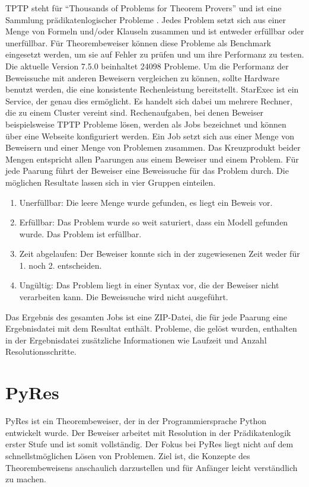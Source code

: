 TPTP steht für "`Thousands of Problems for Theorem Provers"' und ist eine Sammlung prädikatenlogischer Probleme \cite{Sutcliff2021TPTP}. Jedes Problem setzt sich aus einer Menge von Formeln und/oder Klauseln zusammen und ist entweder erfüllbar oder unerfüllbar. Für Theorembeweiser können diese Probleme als Benchmark eingesetzt werden, um sie auf Fehler zu prüfen und um ihre Performanz zu testen. Die aktuelle Version 7.5.0 beinhaltet 24098 Probleme.
Um die Performanz der Beweissuche mit anderen Beweisern vergleichen zu können, sollte Hardware benutzt werden, die eine konsistente Rechenleistung bereitstellt. StarExec ist ein Service, der genau dies ermöglicht. Es handelt sich dabei um mehrere Rechner, die zu einem Cluster vereint sind. \cite{Sutcliff2022StarExec}
 Rechenaufgaben, bei denen Beweiser beispielsweise TPTP Probleme lösen, werden als Jobs bezeichnet und können über eine Webseite konfiguriert werden. Ein Job setzt sich aus einer Menge von Beweisern und einer Menge von Problemen zusammen. Das Kreuzprodukt beider Mengen entspricht allen Paarungen aus einem Beweiser und einem Problem. Für jede Paarung führt der Beweiser eine Beweissuche für das Problem durch. Die möglichen Resultate lassen sich in vier Gruppen einteilen. 
\begin{enumerate}
	\item Unerfüllbar: Die leere Menge wurde gefunden, es liegt ein Beweis vor.
	\item Erfüllbar: Das Problem wurde so weit saturiert, dass ein Modell gefunden wurde. Das Problem ist erfüllbar.
	\item Zeit abgelaufen: Der Beweiser konnte sich in der zugewiesenen Zeit weder für 1. noch 2. entscheiden.
	\item Ungültig: Das Problem liegt in einer Syntax vor, die der Beweiser nicht verarbeiten kann. Die Beweissuche wird nicht ausgeführt.
\end{enumerate}
Das Ergebnis des gesamten Jobs ist eine ZIP-Datei, die für jede Paarung eine Ergebnisdatei mit dem Resultat enthält. Probleme, die gelöst wurden, enthalten in der Ergebnisdatei zusätzliche Informationen wie Laufzeit und Anzahl Resolutionsschritte.


	\section{PyRes}
PyRes ist ein Theorembeweiser, der in der Programmiersprache Python entwickelt wurde. Der Beweiser arbeitet mit Resolution in der Prädikatenlogik erster Stufe und ist somit vollständig. Der Fokus bei PyRes liegt nicht auf dem schnellstmöglichen Lösen von Problemen. Ziel ist, die Konzepte des Theorembeweisens anschaulich darzustellen und für Anfänger leicht verständlich zu machen. \cite{Schulz2020PyRes}

